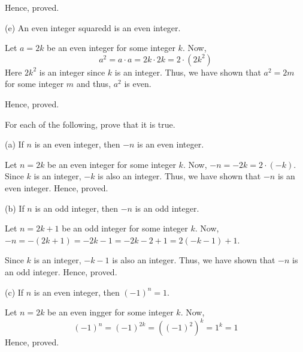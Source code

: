 \begin{problem}
\begin{solution}
		Hence, proved.
	\end{solution}
	
	(e) An even integer squaredd is an even integer.
	\begin{solution}
		Let $a = 2k$ be an even integer for some integer $k$. Now,
		$$a^2 = a \cdot a = 2k \cdot 2k = 2 \cdot (2k^2)$$
		Here $2k^2$ is an integer since $k$ is an integer. Thus, we have shown that $a^2 = 2m$ for some integer $m$ and thus, $a^2$ is even.

		Hence, proved.
	\end{solution}

\end{problem}


\begin{problem}
	For each of the following, prove that it is true.

	(a) If $n$ is an even integer, then $-n$ is an even integer.
	\begin{solution}
		Let $n = 2k$ be an even integer for some integer $k$. Now, $-n = -2k = 2 \cdot (-k)$. Since $k$ is an integer, $-k$ is also an integer. Thus, we have shown that $-n$ is an even integer. Hence, proved.
	\end{solution}

	(b) If $n$ is an odd integer, then $-n$ is an odd integer.
	\begin{solution}
		Let $n = 2k+1$ be an odd integer for some integer $k$. Now, $-n = -(2k+1) =-2k-1 = -2k-2+1 = 2(-k-1) + 1$.

		Since $k$ is an integer, $-k-1$ is also an integer. Thus, we have shown that $-n$ is an odd integer. Hence, proved.
	\end{solution}

	(c) If $n$ is an even integer, then $(-1)^n = 1$.
	\begin{solution}
		Let $n = 2k$ be an even ingger for some integer $k$. Now, 
		$$(-1)^n = (-1)^{2k} = ((-1)^2)^k = 1^k = 1$$
		Hence, proved.
	\end{solution}
\end{problem}
